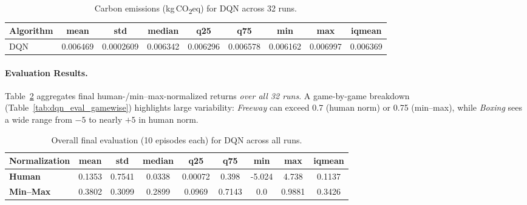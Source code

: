 \begin{table}[htbp]
	\centering
	\begin{tabular}{lcccccccc}
		\toprule
		\textbf{Algorithm} & \textbf{mean} & \textbf{std} & \textbf{median} & 
		\textbf{q25} & \textbf{q75} & \textbf{min} & \textbf{max} & \textbf{iqmean} \\
		\midrule
		DQN & 0.006469 & 0.0002609 & 0.006342 & 0.006296 & 0.006578 & 0.006162 & 0.006997 & 0.006369 \\
		\bottomrule
	\end{tabular}
	\caption{Carbon emissions (kg\,CO\textsubscript{2}eq) for DQN across 32 runs.}
	\label{tab:dqn_emissions}
\end{table}

\paragraph{Evaluation Results.}
Table~\ref{tab:dqn_eval_overall} aggregates final human-/min--max-normalized 
returns \emph{over all 32 runs}. A game-by-game breakdown 
(Table~\ref{tab:dqn_eval_gamewise}) highlights large variability: 
\emph{Freeway} can exceed 0.7 (human norm) or 0.75 (min--max), 
while \emph{Boxing} sees a wide range from $-5$ to nearly $+5$ in human norm.

\begin{table}[htbp]
	\centering
	\begin{tabular}{lcccccccc}
		\toprule
		\textbf{Normalization} & \textbf{mean} & \textbf{std} & \textbf{median} & 
		\textbf{q25} & \textbf{q75} & \textbf{min} & \textbf{max} & \textbf{iqmean} \\
		\midrule
		\textbf{Human} & 0.1353 & 0.7541 & 0.0338 & 0.00072 & 0.398 & -5.024 & 4.738 & 0.1137 \\
		\textbf{Min--Max} & 0.3802 & 0.3099 & 0.2899 & 0.0969 & 0.7143 & 0.0 & 0.9881 & 0.3426 \\
		\bottomrule
	\end{tabular}
	\caption{Overall final evaluation (10 episodes each) for DQN across all runs.}
	\label{tab:dqn_eval_overall}
\end{table}

